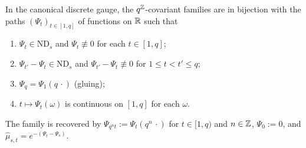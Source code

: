 \begin{theorem}
\label{thm:annulus-parametrization}

In the canonical discrete gauge, the $q^{\mathbb{Z}}$-covariant families are in bijection with the paths
$(\Psi_t)_{t \in [1,q]}$ of functions on $\mathbb{R}$ such that
\begin{enumerate}
\item $\Psi_t \in \mathrm{ND}_s$ and $\Psi_t \not\equiv 0$ for each $t \in [1,q]$;
\item $\Psi_{t'} - \Psi_t \in \mathrm{ND}_s$ and $\Psi_{t'} - \Psi_t \not\equiv 0$ for
$1 \le t < t' \le q$;
\item $\Psi_q = \Psi_1(q\,\cdot)$ (gluing);
\item $t \mapsto \Psi_t(\omega)$ is continuous on $[1,q]$ for each $\omega$.
\end{enumerate}
The family is recovered by $\Psi_{q^nt} := \Psi_t(q^n\,\cdot)$ for $t \in [1,q)$ and $n \in \mathbb{Z}$,
$\Psi_0 := 0$, and $\widehat\mu_{s,t} = e^{-(\Psi_t - \Psi_s)}$.
\end{theorem}

